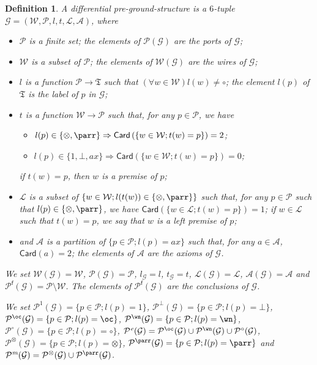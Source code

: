 \documentclass{article}
\newcommand{\target}[1]{t_{#1}}
\theoremstyle{plain}
\newtheorem{definition}{Definition}
\newcommand{\leftwires}[1]{\mathcal{L}(#1)}
\newcommand{\labelofcell}[1]{l_{#1}}
\newcommand{\typesoflinks}{\mathfrak{T}}
\newcommand{\tens}{\otimes}
\newcommand{\one}{1}
\newcommand{\bottom}{\bot}
\newcommand{\cod}{\oc}
\newcommand{\contr}{\wn}
\newcommand{\ports}[1]{\mathcal{P}(#1)}
\newcommand{\conclusions}[1]{\mathcal{P}^{\textsf{f}}(#1)}
\newcommand{\axioms}[1]{\mathcal{A}(#1)}
\newcommand{\multiplicativeports}[1]{\mathcal{P}^\textit{m}(#1)}
\newcommand{\Card}[1]{\textsf{Card}\left( #1 \right)}
\newcommand{\portsoftype}[2]{\mathcal{P}^{#1}(#2)}
\newcommand{\exponentialports}[1]{\mathcal{P}^{\textit{e}}(#1)}
\newcommand{\wires}[1]{\mathcal{W}(#1)}
\begin{document}
\begin{definition}\label{defin: diff pre-ground-structure}
A \emph{differential pre-ground-structure} is a $6$-tuple $\mathcal{G} = (\mathcal{W}, \mathcal{P}, l, t, \mathcal{L}, \mathcal{A})$, where
\begin{itemize}
\item $\mathcal{P}$ is a finite set; the elements of $\ports{\mathcal{G}}$ are the \emph{ports of $\mathcal{G}$};
\item $\mathcal{W}$ is a subset of $\mathcal{P}$; the elements of $\wires{\mathcal{G}}$ are the \emph{wires of $\mathcal{G}$};
\item $l$ is a function $\mathcal{P} \to \typesoflinks$ such that $(\forall w \in \mathcal{W}) l(w) \not= \circ$; the element $l(p)$ of $\typesoflinks$ is the \emph{label of $p$ in $\mathcal{G}$};
\item $t$ is a function $\mathcal{W} \to \mathcal{P}$ such that, for any $p \in \mathcal{P}$, we have
\begin{itemize}
\item $l(p) \in \{ \tens, \parr \} \Rightarrow \Card{\{ w \in \mathcal{W} ; t(w) = p \}} = 2$;
\item $l(p) \in \{ \one, \bottom, \textit{ax} \} \Rightarrow \Card{\{ w \in \mathcal{W} ; t(w) = p \}} = 0$;
\end{itemize}
if $t(w) = p$, then $w$ is a \emph{premise of $p$};
\item $\mathcal{L}$ is a subset of $\{ w \in \mathcal{W}; l(t(w)) \in \{ \tens, \parr \} \}$ such that, for any $p \in \mathcal{P}$ such that $l(p) \in \{ \tens, \parr \}$, we have $\Card{\{ w \in \mathcal{L} ; t(w) = p \}} = 1$; if $w \in \mathcal{L}$ such that $t(w) = p$, we say that $w$ is a \emph{left premise of $p$;}
\item and $\mathcal{A}$ is a partition of $\{ p \in \mathcal{P} ; l(p) = \textit{ax} \}$ such that, for any $a \in \mathcal{A}$, $\Card{a} = 2$; the elements of $\mathcal{A}$ are the \emph{axioms of $\mathcal{G}$}.
\end{itemize}
We set $\wires{\mathcal{G}} = \mathcal{W}$, $\ports{\mathcal{G}} = \mathcal{P}$, $\labelofcell{\mathcal{G}} = l$, $\target{\mathcal{G}} = t$, $\leftwires{\mathcal{G}} = \mathcal{L}$, $\axioms{\mathcal{G}} = \mathcal{A}$ and $\conclusions{\mathcal{G}} = \mathcal{P} \setminus \mathcal{W}$. The elements of $\conclusions{\mathcal{G}}$ are the \emph{conclusions of $\mathcal{G}$}.

We set $\portsoftype{\one}{\mathcal{G}} = \{ p \in \mathcal{P}; l(p) = \one \}$, $\portsoftype{\bot}{\mathcal{G}} = \{ p \in \mathcal{P}; l(p) = \bot \}$, 
$\portsoftype{\cod}{\mathcal{G}} = \{ p \in \mathcal{P}; l(p) = \cod \}$, $\portsoftype{\contr}{\mathcal{G}} = \{ p \in \mathcal{P} ; l(p) = \contr \}$, $\portsoftype{\circ}{\mathcal{G}} = \{ p \in \mathcal{P} ; l(p) = \circ \}$, 
$\exponentialports{\mathcal{G}} = \portsoftype{\cod}{\mathcal{G}} \cup \portsoftype{\contr}{\mathcal{G}} \cup \portsoftype{\circ}{\mathcal{G}}$, $\portsoftype{\tens}{\mathcal{G}} = \{ p \in \mathcal{P}; l(p) = \tens \}$, $\portsoftype{\parr}{\mathcal{G}} = \{ p \in \mathcal{P}; l(p) = \parr \}$ and $\multiplicativeports{\mathcal{G}} = \portsoftype{\tens}{\mathcal{G}} \cup \portsoftype{\parr}{\mathcal{G}}$.



\end{definition}
\end{document}
